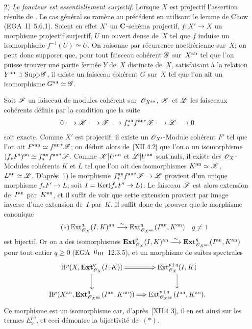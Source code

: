 2) \emph{Le foncteur est essentiellement surjectif}. Lorsque $X$ est
projectif l'assertion r\'esulte de \cite[~th.\, 3]{XII.10}. Le cas
g\'en\'eral se ram\`ene au pr\'ec\'edent en utilisant le
lemme de Chow (EGA~II~5.6.1). Soient en effet $X'$ un $\mathbf{C}$-sch\'ema
projectif, $f\colon X'\to X$ un morphisme projectif surjectif, $U$ un
ouvert dense de~$X$ tel que $f$ induise un isomorphisme
$f^{-1}(U)\simeq U$. On raisonne par r\'ecurrence noeth\'erienne
sur~$X$; on peut donc supposer que, pour tout faisceau coh\'erent
$\cal{G}$ sur~$X^{\mathrm{an}}$ tel que l'on puisse trouver une partie
ferm\'ee $Y$ de~$X$ distincte de~$X$, satisfaisant \`a la relation
$Y^{\an}\supset \Supp \cal{G}$, il existe un faisceau coh\'erent $G$
sur~$X$ tel que l'on ait un isomorphisme $G^{\an}\simeq \cal{G}$.

Soit $\cal{F}$ un faisceau de modules coh\'erent sur~$\cal{O}_{X^{\an}}$, $\cal{K}$ et $\cal{L}$ les faisceaux
coh\'erents d\'efinis par la condition que la suite
$$
0\to\cal{K}\to\cal{F}\to f_*^{\an}f^{\an *}\cal{F}\to\cal{L}\to 0
$$
soit exacte. Comme $X'$ est projectif, il existe un
$\cal{O}_{X'}$-Module coh\'erent $F'$ tel que l'on ait
$F'^{\an}\simeq {f^{\an}}^*\cal{F}$; on d\'eduit alors
de~\ref{XII.4.2} que l'on a un isomorphisme $(f_*F')^{\an}\simeq
f_*^{\an}{f^{\an}}^*\cal{F}$. Comme $\cal{K}|U^{\an}$ et
$\cal{L}|U^{\an}$ sont nuls, il existe des $\cal{O}_X$-Modules
coh\'erents $K$ et $L$ tel que l'on ait des isomorphismes
$K^{\an}\simeq \cal{K}$, $L^{\an}\simeq \cal{L}$. D'apr\`es~1) le
morphisme $f_*^{\an}{f^{\an}}^*\cal{F}\to\cal{L}$ provient d'un unique
morphisme $f_*F'\to L$; soit $I=\Ker(f_*F'\to L)$. Le faisceau
$\cal{F}$ est alors extension de~$I^{\mathrm{an}}$ par~$K^{\mathrm{an}}$, et il suffit
de voir que cette extension provient
par image inverse d'une extension de~$I$ par~$K$. Il suffit donc de
prouver que le morphisme canonique
\begin{equation*}
\label{eq:XII.4.*}
\tag{$*$} \Ext_{\cal{O}_X}^q(I,K)^{\an}\isomto
\Ext_{\cal{O}_{X^{\an}}}^q(I^{\an},K^{\an})\quad q\neq 1
\end{equation*}
est bijectif. Or on a des isomorphismes
$\mathbf{Ext}_{\cal{O}_X}^q(I,K)^{\an}\isomto
\mathbf{Ext}_{\cal{O}_{X^{\an}}}^q(I^{\an},K^{\an})$ pour tout entier
$q\geq 0$ (EGA~$0_{\textup{III}}$~12.3.5), et un morphisme de suites
spectrales
$$
\xymatrix@R=.7cm@C=.5cm{{\H^p(X,\mathbf{Ext}_{\cal{O}_X}^q(I,K))}\ar@{=>}[r]\ar[d]&{\mathrm{Ext}_{\cal{O}_X}^{p+q}(I,K)}\ar[d]\\{\H^p(X^{\an},\mathbf{Ext}_{\cal{O}_{X^{\an}}}^q(I^{\an},K^{\an}))}\ar@{=>}[r]&{\mathrm{Ext}_{\cal{O}_{X^{\an}}}^{p+q}(I^{\an},K^{\an}).}}
$$
Ce morphisme est un isomorphisme car, d'apr\`es~\ref{XII.4.3}, il en
est ainsi sur les termes $E^{pq}_2$, et ceci d\'emontre la
bijectivit\'e de~$(*)$.

